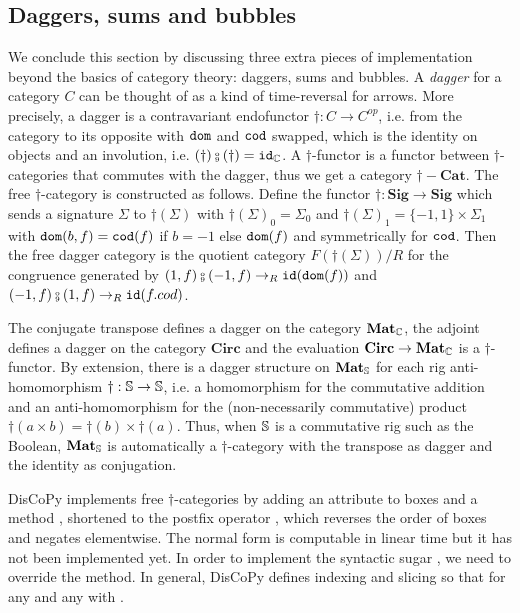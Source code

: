 \subsection{Daggers, sums and bubbles}\label{subsection:dagger-sums-bubbles}

We conclude this section by discussing three extra pieces of implementation beyond the basics of category theory: daggers, sums and bubbles.
A \emph{dagger} for a category $C$ can be thought of as a kind of time-reversal for arrows.
More precisely, a dagger is a contravariant endofunctor $\dagger : C \to C^{op}$, i.e. from the category to its opposite with $\dom$ and $\cod$ swapped, which is the identity on objects and an involution, i.e. $(\dagger) \fcmp (\dagger) = \id_\C$.
A $\dagger$-functor is a functor between $\dagger$-categories that commutes with the dagger, thus we get a category $\dagger-\mathbf{Cat}$.
The free $\dagger$-category is constructed as follows.
Define the functor $\dagger : \mathbf{Sig} \to \mathbf{Sig}$ which sends a signature $\Sigma$ to $\dagger(\Sigma)$ with
$\dagger(\Sigma)_0 = \Sigma_0$ and $\dagger(\Sigma)_1 = \{ -1, 1 \} \times \Sigma_1$ with $\dom(b, f) = \cod(f)$ if $b = -1$ else $\dom(f)$ and symmetrically for $\cod$.
Then the free dagger category is the quotient category $F(\dagger(\Sigma)) / R$ for the congruence generated by $(1, f) \fcmp (-1, f) \to_R \id(\dom(f))$ and $(-1, f) \fcmp (1, f) \to_R \id(f.cod)$.

\begin{example}
The conjugate transpose defines a dagger on the category $\mathbf{Mat}_\C$, the adjoint defines a dagger on the category $\mathbf{Circ}$ and the evaluation $\mathbf{Circ} \to \mathbf{Mat}_\C$ is a $\dagger$-functor.
By extension, there is a dagger structure on $\mathbf{Mat}_\S$ for each rig anti-homomorphism $\dagger : \S \to \S$, i.e. a homomorphism for the commutative addition and an anti-homomorphism for the (non-necessarily commutative) product $\dagger(a \times b) = \dagger(b) \times \dagger(a)$.
Thus, when $\S$ is a commutative rig such as the Boolean, $\mathbf{Mat}_\S$ is automatically a $\dagger$-category with the transpose as dagger and the identity as conjugation.
\end{example}

DisCoPy implements free $\dagger$-categories by adding an attribute  to boxes and a method , shortened to the postfix operator \py{[::-1]}, which reverses the order of boxes and negates  elementwise.
The normal form is computable in linear time but it has not been implemented yet.
In order to implement the syntactic sugar , we need to override the  method.
In general, DisCoPy defines indexing  and slicing  so that  for any  and any  with .

